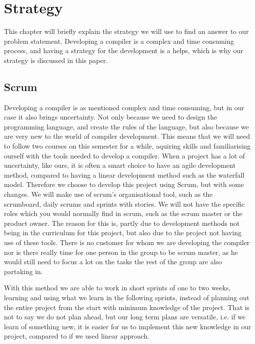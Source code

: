 \chapter{Strategy}\label{Metode}

This chapter will briefly explain the strategy we will use to find an answer to our problem statement. 
Developing a compiler is a complex and time consuming process, and having a strategy for the development is a helps, which is why our strategy is discussed in this paper.

\section{Scrum}

Developing a compiler is as mentioned complex and time consuming, but in our case it also brings uncertainty. 
Not only because we need to design the programming language, and create the rules of the language, but also because we are very new to the world of compiler development.
This means that we will need to follow two courses on this semester for a while, aquiring skills and familiarising ourself with the tools needed to develop a compiler.
When a project has a lot of uncertainty, like ours, it is often a smart choice to have an agile development method, compared to having a linear development method such as the waterfall model.
Therefore we choose to develop this project using Scrum, but with some changes.
We will make use of scrum's organisational tool, such as the scrumboard, daily scrums and sprints with stories.
We will not have the specific roles which you would normally find in scrum, such as the scrum master or the product owner. \citep{Scrum}
The reason for this is, partly due to development methods not being in the curriculum for this project, but also due to the project not having use of these tools.
There is no customer for whom we are developing the compiler nor is there really time for one person in the group to be scrum master, as he would still need to focus a lot on the tasks the rest of the group are also partaking in.

With this method we are able to work in short sprints of one to two weeks, learning and using what we learn in the following sprints, instead of planning out the entire project from the start with minimum knowledge of the project.
That is not to say we do not plan ahead, but our long term plans are versatile, i.e. if we learn of something new, it is easier for us to implement this new knowledge in our project, compared to if we used linear approach.